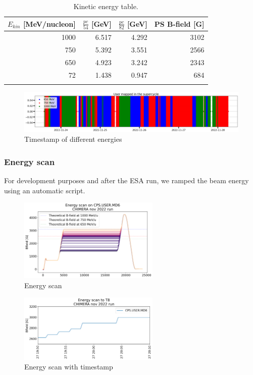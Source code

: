 \begin{table}[h!]
\centering
\begin{tabular}{rrrr}
\toprule
 $E_{kin}$ [MeV/nucleon] &  $\frac{pc}{54}$ [GeV] &  $\frac{pc}{82}$ [GeV] &  PS B-field [G] \\
\midrule
  1000 &                        6.517 &                    4.292 &        3102 \\
   750 &                        5.392 &                    3.551 &        2566 \\
   650 &                        4.923 &                    3.242 &        2343 \\
    72 &                        1.438 &                    0.947 &         684 \\
\bottomrule
\label{fig:lookup table}
\end{tabular}
\caption{Kinetic energy table.}
\label{table:KE_table}
\end{table}

\begin{figure}[!htb]
\centering
\includegraphics[width=1.0\textwidth]{images/Pasted image 20221130110611.png}
\caption{Timestamp of different energies}
\label{fig:timestamp_energies}
\end{figure}

\subsubsection{Energy scan}

For development purposes and after the ESA run, we ramped the beam energy using an automatic script.

\begin{figure}[!htb]
\centering
\includegraphics[width=0.6\textwidth]{images/energy_scan_chimera 1.png}
\caption{Energy scan}
\label{fig:energy_scan}
\end{figure}


\begin{figure}[!htb]
\centering
\includegraphics[width=0.6\textwidth]{images/energy_scan_timestamp_chimera 1.png}
\caption{Energy scan with timestamp}
\label{fig:energy_scan_timestamp}
\end{figure}
